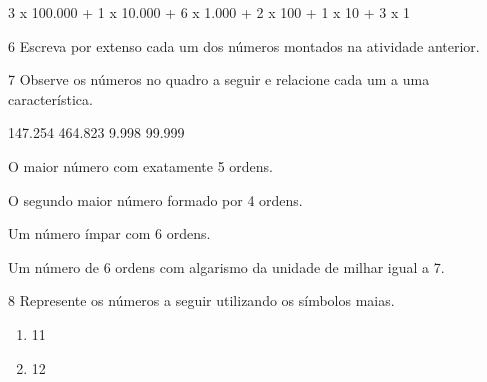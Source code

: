 \begin{escolha}
\begin{escolha}
\item 3 x 100.000 + 1 x 10.000 + 6 x 1.000 + 2 x 100 + 1 x 10 + 3 x 1 
\end{escolha}

\num{6} Escreva por extenso cada um dos números montados na atividade anterior.


\num{7} Observe os números no quadro a seguir e relacione cada um a uma característica.

\begin{mdframed}[linewidth=2pt,linecolor=azul!20,backgroundcolor=azul!20,roundcorner=2pt]
147.254 \hfill 464.823 \hfill 9.998 \hfill 99.999
\end{mdframed}

\begin{escolha}
\item O maior número com exatamente 5 ordens. 

\item O segundo maior número formado por 4 ordens. 

\item Um número ímpar com 6 ordens. 

\item Um número de 6 ordens com algarismo da unidade de milhar igual a 7. 
\end{escolha}

\num{8} Represente os números a seguir utilizando os símbolos maias.

\begin{enumerate}
\item
  11

\begin{mdframed}[linewidth=2pt,linecolor=salmao,roundcorner=2pt]
\vspace{1cm}
\end{mdframed}

\item
  12

\begin{mdframed}[linewidth=2pt,linecolor=salmao,roundcorner=2pt]
\vspace{1cm}
\end{mdframed}


\end{enumerate}
\end{escolha}
